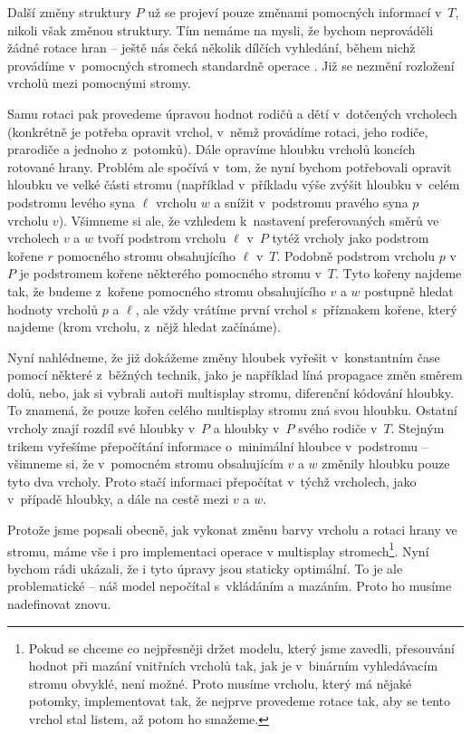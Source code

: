 Další změny struktury $P$ už se projeví pouze změnami pomocných informací
v~$T$, nikoli však změnou struktury. Tím nemáme na mysli, že bychom neprováděli
žádné rotace hran -- ještě nás čeká několik dílčích vyhledání, během nichž
provádíme v~pomocných stromech standardně operace . Již se nezmění
rozložení vrcholů mezi pomocnými stromy.

Samu rotaci pak provedeme úpravou hodnot rodičů a dětí v~dotčených vrcholech
(konkrétně je potřeba opravit vrchol, v~němž provádíme rotaci, jeho rodiče,
prarodiče a jednoho z~potomků). Dále opravíme hloubku vrcholů koncích rotované hrany. Problém ale spočívá v~tom, že nyní bychom
potřebovali opravit hloubku ve velké části stromu (například v~příkladu výše
zvýšit hloubku v~celém podstromu levého syna $\ell$ vrcholu $w$ a snížit
v~podstromu pravého syna $p$ vrcholu $v$). Všimneme si ale, že vzhledem
k~nastavení preferovaných směrů ve vrcholech $v$ a $w$ tvoří podstrom vrcholu
$\ell$ v~$P$ tytéž vrcholy jako podstrom kořene $r$ pomocného stromu
obsahujícího $\ell$ v~$T$. Podobně podstrom vrcholu $p$ v~$P$ je podstromem
kořene některého pomocného stromu v~$T$. Tyto kořeny najdeme tak, že budeme
z~kořene pomocného stromu obsahujícího $v$ a $w$ postupně hledat hodnoty
vrcholů $p$ a $\ell$, ale vždy vrátíme první vrchol s~příznakem kořene, který
najdeme (krom vrcholu, z~nějž hledat začínáme).

Nyní nahlédneme, že již dokážeme změny hloubek vyřešit v~konstantním čase pomocí některé
z~běžných technik, jako je například líná propagace změn směrem dolů, nebo, jak si
vybrali autoři multisplay stromu, diferenční kódování hloubky. To znamená, že
pouze kořen celého multisplay stromu zná svou hloubku. Ostatní vrcholy znají
rozdíl své hloubky v~$P$ a hloubky v~$P$ svého rodiče v~$T$. Stejným trikem
vyřešíme přepočítání informace o~minimální hloubce v~podstromu -- všimneme si, že
v~pomocném stromu obsahujícím $v$ a $w$ změnily hloubku pouze tyto dva vrcholy.
Proto stačí informaci přepočítat v~týchž vrcholech, jako v~případě hloubky, a
dále na cestě mezi $v$ a $w$.

Protože jsme popsali obecně, jak vykonat změnu barvy vrcholu a rotaci hrany ve
stromu, máme vše i pro implementaci operace  v multisplay
stromech\footnote{Pokud se chceme co nejpřesněji držet modelu, který jsme
zavedli, přesouvání hodnot při mazání vnitřních vrcholů tak, jak je v~binárním
vyhledávacím stromu obvyklé, není možné. Proto musíme  vrcholu,
který má nějaké potomky, implementovat tak, že nejprve provedeme rotace tak,
aby se tento vrchol stal listem, až potom ho smažeme.}. Nyní bychom rádi ukázali,
že i tyto úpravy jsou staticky optimální. To je ale problematické -- náš model
nepočítal s~vkládáním a mazáním. Proto ho musíme nadefinovat znovu.

